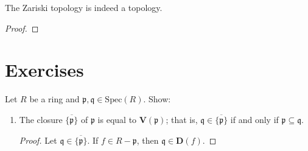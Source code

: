 \begin{prps}
    The Zariski topology is indeed a topology.
\end{prps}
\begin{proof}
    
\end{proof}

\section{Exercises}
\begin{exr}
    Let \(R\) be a ring and \(\mathfrak{p}, \mathfrak{q} \in \mathrm{Spec}(R)\). Show:
    \begin{enumerate}
        \item The closure \(\overline{\{\mathfrak{p}\}}\) of \(\mathfrak{p}\) is equal to \(\mathbf{V}(\mathfrak{p})\); that is, \(\mathfrak{q} \in \overline{\{\mathfrak{p}\}}\) if and only if \(\mathfrak{p} \subseteq \mathfrak{q}\).
        \begin{proof}
            Let \(\mathfrak{q} \in \overline{\{\mathfrak{p}\}}\). If \(f \in R - \mathfrak{p}\), then \(\mathfrak{q} \in \mathbf{D}(f)\).
        \end{proof}
    \end{enumerate}
\end{exr}